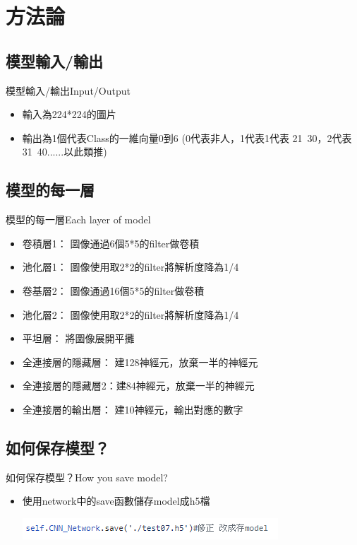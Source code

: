\documentclass[utf8x]{beamer}
\begin{document}
\section{方法論}

\subsection{模型輸入/輸出}
\begin{frame}{模型輸入/輸出}{Input/Output}
  \begin{itemize}
  \item {
    輸入為224*224的圖片
  }
 \item {
    輸出為1個代表Class的一維向量0到6 (0代表非人，1代表1代表 21~30，2代表31~40......以此類推)
  }
  \end{itemize}
\end{frame}
\subsection{模型的每一層}
\begin{frame}{模型的每一層}{Each layer of model}
  \begin{itemize}
  \item {
    卷積層1： 圖像通過6個5*5的filter做卷積
  }
 \item {
    池化層1： 圖像使用取2*2的filter將解析度降為1/4
  }
\item {
    卷基層2： 圖像通過16個5*5的filter做卷積
  }
\item {
    池化層2： 圖像使用取2*2的filter將解析度降為1/4
  }
\item {
    平坦層： 將圖像展開平攤
  }
\item {
    全連接層的隱藏層： 建128神經元，放棄一半的神經元
  }
\item {
    全連接層的隱藏層2：建84神經元，放棄一半的神經元
  }
\item {
    全連接層的輸出層： 建10神經元，輸出對應的數字
  }
  \end{itemize}
\end{frame}
\subsection{如何保存模型？}
\begin{frame}{如何保存模型？}{How you save model?}
  \begin{itemize}
  \item {
    使用network中的save函數儲存model成h5檔
  }
    \begin{minipage}[c][0.4\textheight][c]{\linewidth}
                \centering
                \includegraphics[width=1.0\linewidth]{save.png}
            \end{minipage}
  \end{itemize}
\end{frame}
\end{document}
